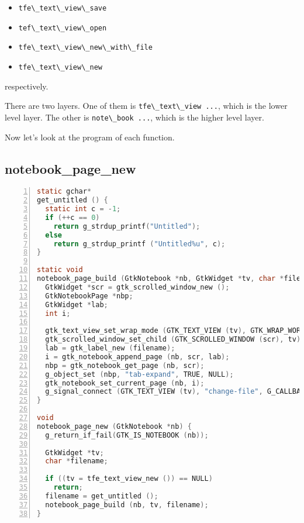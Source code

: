 \begin{itemize}
\tightlist
\item
  \passthrough{\lstinline!tfe\_text\_view\_save!}
\item
  \passthrough{\lstinline!tef\_text\_view\_open!}
\item
  \passthrough{\lstinline!tfe\_text\_view\_new\_with\_file!}
\item
  \passthrough{\lstinline!tfe\_text\_view\_new!}
\end{itemize}

respectively.

There are two layers. One of them is
\passthrough{\lstinline!tfe\_text\_view ...!}, which is the lower level
layer. The other is \passthrough{\lstinline!note\_book ...!}, which is
the higher level layer.

Now let's look at the program of each function.

\hypertarget{notebook_page_new}{%
\subsection{notebook\_page\_new}\label{notebook_page_new}}

\begin{lstlisting}[language=C, numbers=left]
static gchar*
get_untitled () {
  static int c = -1;
  if (++c == 0) 
    return g_strdup_printf("Untitled");
  else
    return g_strdup_printf ("Untitled%u", c);
}

static void
notebook_page_build (GtkNotebook *nb, GtkWidget *tv, char *filename) {
  GtkWidget *scr = gtk_scrolled_window_new ();
  GtkNotebookPage *nbp;
  GtkWidget *lab;
  int i;

  gtk_text_view_set_wrap_mode (GTK_TEXT_VIEW (tv), GTK_WRAP_WORD_CHAR);
  gtk_scrolled_window_set_child (GTK_SCROLLED_WINDOW (scr), tv);
  lab = gtk_label_new (filename);
  i = gtk_notebook_append_page (nb, scr, lab);
  nbp = gtk_notebook_get_page (nb, scr);
  g_object_set (nbp, "tab-expand", TRUE, NULL);
  gtk_notebook_set_current_page (nb, i);
  g_signal_connect (GTK_TEXT_VIEW (tv), "change-file", G_CALLBACK (file_changed_cb), nb);
}

void
notebook_page_new (GtkNotebook *nb) {
  g_return_if_fail(GTK_IS_NOTEBOOK (nb));

  GtkWidget *tv;
  char *filename;

  if ((tv = tfe_text_view_new ()) == NULL)
    return;
  filename = get_untitled ();
  notebook_page_build (nb, tv, filename);
}
\end{lstlisting}

